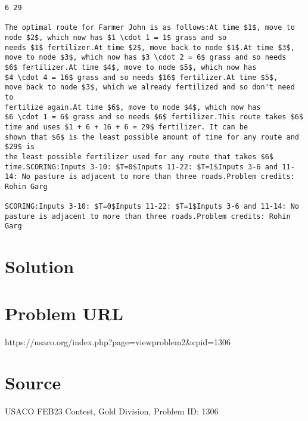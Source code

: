 \documentclass[12pt]{article}
\begin{document}
\begin{verbatim}
6 29

The optimal route for Farmer John is as follows:At time $1$, move to node $2$, which now has $1 \cdot 1 = 1$ grass and so
needs $1$ fertilizer.At time $2$, move back to node $1$.At time $3$, move to node $3$, which now has $3 \cdot 2 = 6$ grass and so needs
$6$ fertilizer.At time $4$, move to node $5$, which now has
$4 \cdot 4 = 16$ grass and so needs $16$ fertilizer.At time $5$,
move back to node $3$, which we already fertilized and so don't need to
fertilize again.At time $6$, move to node $4$, which now has
$6 \cdot 1 = 6$ grass and so needs $6$ fertilizer.This route takes $6$ time and uses $1 + 6 + 16 + 6 = 29$ fertilizer. It can be
shown that $6$ is the least possible amount of time for any route and $29$ is
the least possible fertilizer used for any route that takes $6$ time.SCORING:Inputs 3-10: $T=0$Inputs 11-22: $T=1$Inputs 3-6 and 11-14: No pasture is adjacent to more than three roads.Problem credits: Rohin Garg

SCORING:Inputs 3-10: $T=0$Inputs 11-22: $T=1$Inputs 3-6 and 11-14: No pasture is adjacent to more than three roads.Problem credits: Rohin Garg
\end{verbatim}

\section*{Solution}


\section*{Problem URL}
https://usaco.org/index.php?page=viewproblem2&cpid=1306

\section*{Source}
USACO FEB23 Contest, Gold Division, Problem ID: 1306
\end{document}
